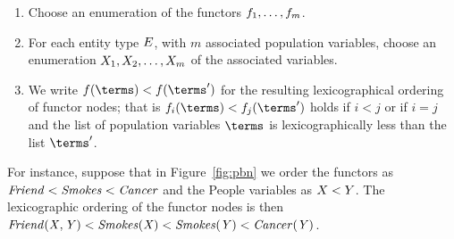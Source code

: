 \begin{enumerate}
\item Choose an enumeration of the functors $f_{1},\ldots,f_{m}$.
\item For each entity type $E$, with $m$ associated population variables, choose an enumeration $X_{1},X_{2},\ldots,X_{m}$ of the associated variables.

\item We write $\functor(\terms)<\functor(\terms')$ for the resulting lexicographical ordering of functor nodes; that is $\functor_{i}(\terms)<\functor_{j}(\terms')$ holds if $i<j$ or if $i=j$ and the list of population variables $\terms$ is lexicographically less than the list $\terms'$.
\end{enumerate}

For instance, suppose that in Figure~\ref{fig:pbn} we order the functors as $\it{Friend} < \it{Smokes} < \it{Cancer}$ and the People variables as $X < Y$. The lexicographic ordering of the functor nodes is then $\it{Friend}(X,Y) < \it{Smokes}(X) < \it{Smokes}(Y) < \it{Cancer}(Y)$.
